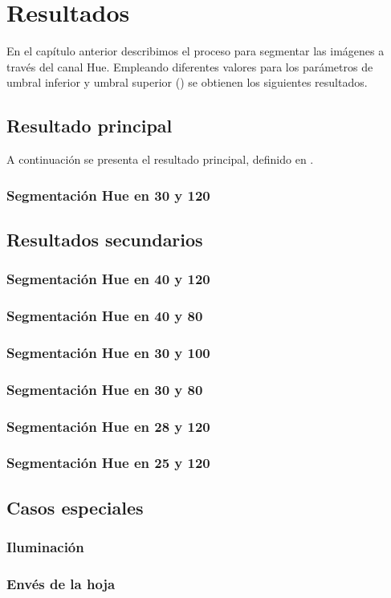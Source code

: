 \chapter{Resultados}
En el capítulo anterior describimos el proceso para segmentar las imágenes a través del canal Hue. Empleando diferentes valores para los parámetros de umbral inferior y umbral superior () se obtienen los siguientes resultados.

\section{Resultado principal}
A continuación se presenta el resultado principal, definido en .

\subsection{Segmentación Hue en 30 y 120}


\section{Resultados secundarios}

\subsection{Segmentación Hue en 40 y 120}


\subsection{Segmentación Hue en 40 y 80}


\subsection{Segmentación Hue en 30 y 100}


\subsection{Segmentación Hue en 30 y 80}


\subsection{Segmentación Hue en 28 y 120}


\subsection{Segmentación Hue en 25 y 120}


\section{Casos especiales}

\subsection{Iluminación}

\subsection{Envés de la hoja}